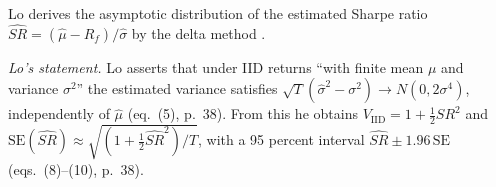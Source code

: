 \begin{qfmethod}\label{meth:sharpe-ratio-standard-error}
 Lo derives the asymptotic distribution of the estimated Sharpe ratio $\widehat{SR}=(\hat\mu-R_f)/\hat\sigma$ by the delta method \citep[``IID Returns'', eqs.~(5)--(9), pp.~37--38]{wide-lo-sharpe}.

\emph{Lo's statement.} Lo asserts that under IID returns ``with finite mean $\mu$ and variance $\sigma^2$'' the estimated variance satisfies $\sqrt T(\hat\sigma^2-\sigma^2)\to N(0,2\sigma^4)$, independently of $\hat\mu$ (eq.~(5), p.~38). From this he obtains $V_{\mathrm{IID}}=1+\tfrac12SR^2$ and $\mathrm{SE}(\widehat{SR})\approx\sqrt{(1+\tfrac12\widehat{SR}^2)/T}$, with a 95 percent interval $\widehat{SR}\pm1.96\,\mathrm{SE}$ (eqs.~(8)--(10), p.~38).


\end{qfmethod}
